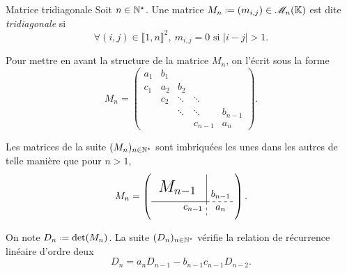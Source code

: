 \begin{defi}{Matrice tridiagonale}
    Soit $n \in \mathbb{N}^\star$. Une matrice $M_n \defeq (m_{i,j}) \in \M_n(\K)$ est dite \emph{tridiagonale} si
    $$\forall (i,j) \in \llbracket 1, n \rrbracket^2,\ m_{i,j} = 0 \text{ si } |i-j| > 1.$$
\end{defi}

Pour mettre en avant la structure de la matrice $M_n$, on l'écrit sous la forme
$$
M_n = \begin{pmatrix}
a_1 & b_1 \\
c_1 & a_2 & b_2 \\
& c_2 & \ddots & \ddots \\
& & \ddots & \ddots & b_{n-1} \\
& & & c_{n-1} & a_n
\end{pmatrix}.
$$

\newcommand{\mattrign}{
\left(\begin{gathered}
    \tikzpicture[every node/.style={anchor=south west}]
        \node[minimum width=1.5cm,minimum height=1cm] at (0.125,0.5) {\LARGE $M_{n-1}$};
        \node[minimum width=1.5cm,minimum height=0.5cm] at (0.75,0) {$c_{n-1}$};
        \node[minimum width=1cm,minimum height=0.5cm] at (2,0) {$a_n$};
        \node[minimum width=1cm,minimum height=1cm] at (2,0.25) {$b_{n-1}$};
        \draw (0,0.5) -- (2,0.5);
        \draw (2,0.5) -- (2,1.5);
        \draw[dashed] (2,0.5) -- (3,0.5);
        \draw[dashed] (2,0.5) -- (2,0);
    \endtikzpicture
    \end{gathered}\right)
}

\begin{remarque}
    Les matrices de la suite $(M_n)_{n \in \mathbb{N}^\star}$ sont imbriquées les unes dans les autres de telle manière que pour $n > 1$,
    $$M_n = \mattrign.$$
\end{remarque}


\begin{prop}
    On note $D_n \defeq \det(M_n)$. La suite $(D_n)_{n \in \mathbb{N}^\star}$ vérifie la relation de récurrence linéaire d'ordre deux 
    $$D_n = a_n D_{n-1} - b_{n-1}c_{n-1}D_{n-2}.$$
\end{prop}

\newcommand{\dettrign}{
\left|\begin{gathered}
    \tikzpicture[every node/.style={anchor=south west}]
        \node[minimum width=1.5cm,minimum height=1cm] at (0.125,0.5) {\LARGE $M_{n-1}$};
        \node[minimum width=1.5cm,minimum height=0.5cm] at (0.75,0) {$c_{n-1}$};
        \node[minimum width=1cm,minimum height=0.5cm] at (2,0) {$a_n$};
        \node[minimum width=1cm,minimum height=1cm] at (2,0.25) {$b_{n-1}$};
        \draw (0,0.5) -- (2,0.5);
        \draw (2,0.5) -- (2,1.5);
        \draw[dashed] (2,0.5) -- (3,0.5);
        \draw[dashed] (2,0.5) -- (2,0);
    \endtikzpicture
    \end{gathered}\right|
}


